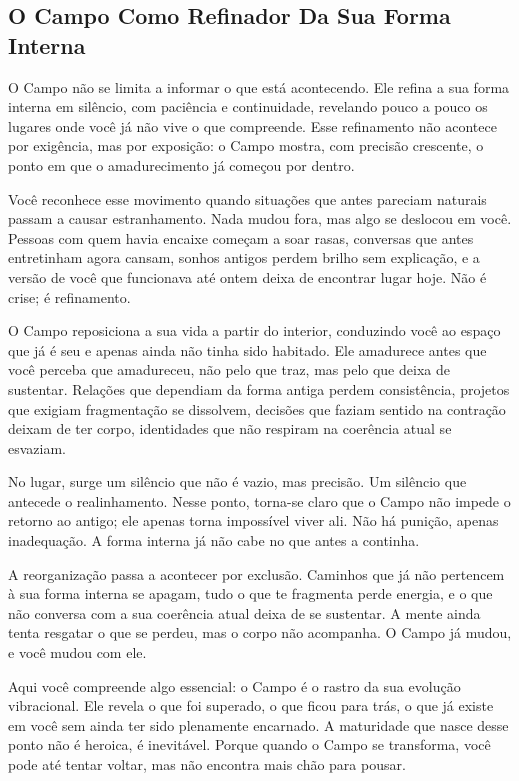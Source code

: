 \documentclass[12pt]{book}
\begin{document}
\subsection*{O Campo Como Refinador Da Sua Forma Interna}

O Campo não se limita a informar o que está acontecendo. Ele refina a sua forma interna em silêncio, com paciência e continuidade, revelando pouco a pouco os lugares onde você já não vive o que compreende. Esse refinamento não acontece por exigência, mas por exposição: o Campo mostra, com precisão crescente, o ponto em que o amadurecimento já começou por dentro.

Você reconhece esse movimento quando situações que antes pareciam naturais passam a causar estranhamento. Nada mudou fora, mas algo se deslocou em você. Pessoas com quem havia encaixe começam a soar rasas, conversas que antes entretinham agora cansam, sonhos antigos perdem brilho sem explicação, e a versão de você que funcionava até ontem deixa de encontrar lugar hoje. Não é crise; é refinamento.

O Campo reposiciona a sua vida a partir do interior, conduzindo você ao espaço que já é seu e apenas ainda não tinha sido habitado. Ele amadurece antes que você perceba que amadureceu, não pelo que traz, mas pelo que deixa de sustentar. Relações que dependiam da forma antiga perdem consistência, projetos que exigiam fragmentação se dissolvem, decisões que faziam sentido na contração deixam de ter corpo, identidades que não respiram na coerência atual se esvaziam.

No lugar, surge um silêncio que não é vazio, mas precisão. Um silêncio que antecede o realinhamento. Nesse ponto, torna-se claro que o Campo não impede o retorno ao antigo; ele apenas torna impossível viver ali. Não há punição, apenas inadequação. A forma interna já não cabe no que antes a continha.

A reorganização passa a acontecer por exclusão. Caminhos que já não pertencem à sua forma interna se apagam, tudo o que te fragmenta perde energia, e o que não conversa com a sua coerência atual deixa de se sustentar. A mente ainda tenta resgatar o que se perdeu, mas o corpo não acompanha. O Campo já mudou, e você mudou com ele.

Aqui você compreende algo essencial: o Campo é o rastro da sua evolução vibracional. Ele revela o que foi superado, o que ficou para trás, o que já existe em você sem ainda ter sido plenamente encarnado. A maturidade que nasce desse ponto não é heroica, é inevitável. Porque quando o Campo se transforma, você pode até tentar voltar, mas não encontra mais chão para pousar.
\end{document}
